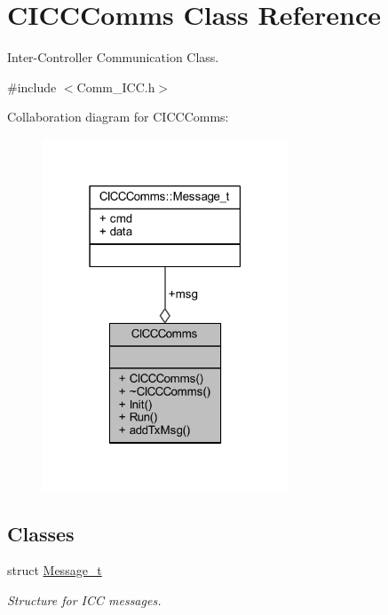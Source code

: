 \hypertarget{class_c_i_c_c_comms}{}\section{C\+I\+C\+C\+Comms Class Reference}
\label{class_c_i_c_c_comms}


Inter-\/\+Controller Communication Class.  




{\ttfamily \#include $<$Comm\+\_\+\+I\+C\+C.\+h$>$}



Collaboration diagram for C\+I\+C\+C\+Comms\+:
\nopagebreak
\begin{figure}[H]
\begin{center}
\leavevmode
\includegraphics[width=207pt]{class_c_i_c_c_comms__coll__graph}
\end{center}
\end{figure}
\subsection*{Classes}
\begin{DoxyCompactItemize}
\item 
struct \mbox{\hyperlink{struct_c_i_c_c_comms_1_1_message__t}{Message\+\_\+t}}
\begin{DoxyCompactList}\small\item\em Structure for I\+CC messages. \end{DoxyCompactList}\end{DoxyCompactItemize}
